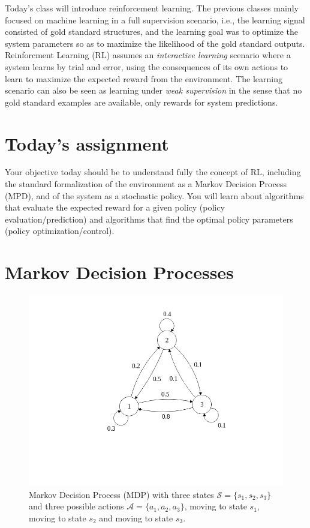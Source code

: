 Today's class will introduce reinforcement learning. The previous classes
mainly focused on machine learning in a full supervision scenario, i.e., the
learning signal consisted of gold standard structures, and the learning goal
was to optimize the system parameters so as to maximize the likelihood of the
gold standard outputs. Reinforcment Learning (RL) assumes an \emph{interactive
learning} scenario where a system learns by trial and error, using the
consequences of its own actions to learn to maximize the expected reward from
the environment. The learning scenario can also be seen as learning under
\emph{weak supervision} in the sense that no gold standard examples are
available, only rewards for system predictions.

\section{Today's assignment}

Your objective today should be to understand fully the concept of RL, including
the standard formalization of the environment as a Markov Decision Process
(MPD), and of the system as a stochastic policy. You will learn about
algorithms that evaluate the expected reward for a given policy (policy
evaluation/prediction) and algorithms that find the optimal policy parameters
(policy optimization/control). 

\section{Markov Decision Processes}

\begin{figure}[!ht]
\centering
\includegraphics[scale=0.5,trim={0 5cm 0 1cm},clip]{figs/reinforcement_learning/mdp.png}
\caption{Markov Decision Process (MDP) with three states $\mathcal{S}=\{s_1,s_2,s_3\}$ and three possible actions $\mathcal{A}=\{a_1,a_2,a_3\}$, moving to state $s_1$, moving to state $s_2$ and moving to state $s_3$.}
\label{fig:MDP}
\end{figure}

